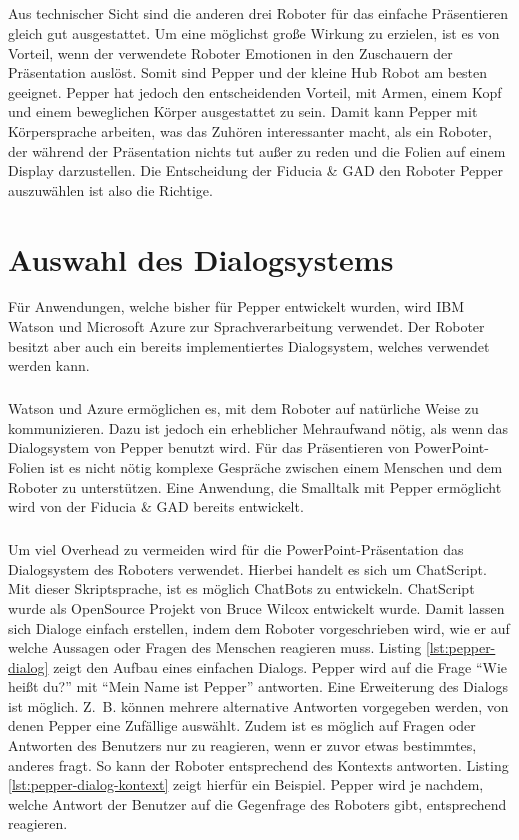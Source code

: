 \subparagraph{}
Aus technischer Sicht sind die anderen drei Roboter für das einfache
Präsentieren gleich gut ausgestattet. Um eine möglichst große Wirkung zu
erzielen, ist es von Vorteil, wenn der verwendete Roboter Emotionen in den
Zuschauern der Präsentation auslöst. Somit sind Pepper und der kleine Hub
Robot am besten geeignet. Pepper hat jedoch den entscheidenden Vorteil, mit
Armen, einem Kopf und einem beweglichen Körper ausgestattet zu sein. Damit kann
Pepper mit Körpersprache arbeiten, was das Zuhören interessanter macht, als ein
Roboter, der während der Präsentation nichts tut außer zu reden und die Folien
auf einem Display darzustellen. Die Entscheidung der Fiducia \& GAD den Roboter
Pepper auszuwählen ist also die Richtige.

\section{Auswahl des Dialogsystems}\label{sec:auswahl-dialogsystem}
Für Anwendungen, welche bisher für Pepper entwickelt wurden, wird IBM Watson und
Microsoft Azure zur Sprachverarbeitung verwendet. Der Roboter besitzt aber auch
ein bereits implementiertes Dialogsystem, welches verwendet werden kann.

\subparagraph{}
Watson und Azure ermöglichen es, mit dem Roboter auf natürliche Weise zu
kommunizieren. Dazu ist jedoch ein erheblicher Mehraufwand nötig, als wenn das
Dialogsystem von Pepper benutzt wird. Für das Präsentieren von PowerPoint-Folien
ist es nicht nötig komplexe Gespräche zwischen einem Menschen und dem Roboter zu
unterstützen. Eine Anwendung, die Smalltalk mit Pepper ermöglicht wird von der
Fiducia \& GAD bereits entwickelt.

%
%

\subparagraph{}
Um viel Overhead zu vermeiden wird für die PowerPoint-Präsentation das
Dialogsystem des Roboters verwendet. Hierbei handelt es sich um ChatScript.
Mit dieser Skriptsprache, ist es möglich ChatBots zu entwickeln. ChatScript
wurde als OpenSource Projekt von Bruce Wilcox entwickelt wurde. Damit lassen
sich Dialoge einfach erstellen, indem dem Roboter vorgeschrieben wird, wie er
auf welche Aussagen oder Fragen des Menschen reagieren muss.
Listing \ref{lst:pepper-dialog} zeigt den Aufbau eines einfachen Dialogs.
Pepper wird auf die Frage "`Wie heißt du?"' mit "`Mein Name ist Pepper"'
antworten. Eine Erweiterung des Dialogs ist möglich. Z.~B. können mehrere
alternative Antworten vorgegeben werden, von denen Pepper eine Zufällige
auswählt. Zudem ist es möglich auf Fragen oder Antworten des Benutzers nur zu
reagieren, wenn er zuvor etwas bestimmtes, anderes fragt.
So kann der Roboter entsprechend des Kontexts antworten. Listing
\ref{lst:pepper-dialog-kontext} zeigt hierfür ein Beispiel. Pepper wird je
nachdem, welche Antwort der Benutzer auf die Gegenfrage des Roboters gibt,
entsprechend reagieren.

